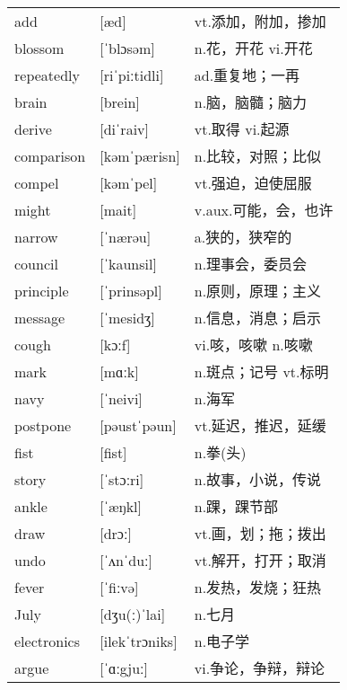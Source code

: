 \documentclass[a4paper]{article}
\begin{document}
\section{}
\begin{tabular}{l l l}

add & [æd] & vt.添加，附加，掺加 \\
blossom & [ˈblɔsəm] & n.花，开花 vi.开花 \\
repeatedly & [riˈpiːtidli] & ad.重复地；一再 \\
brain & [brein] & n.脑，脑髓；脑力 \\
derive & [diˈraiv] & vt.取得 vi.起源 \\
comparison & [kəmˈpærisn] & n.比较，对照；比似 \\
compel & [kəmˈpel] & vt.强迫，迫使屈服 \\
might & [mait] & v.aux.可能，会，也许 \\
narrow & [ˈnærəu] & a.狭的，狭窄的 \\
council & [ˈkaunsil] & n.理事会，委员会 \\
principle & [ˈprinsəpl] & n.原则，原理；主义 \\
message & [ˈmesidʒ] & n.信息，消息；启示 \\
cough & [kɔːf] & vi.咳，咳嗽 n.咳嗽 \\
mark & [mɑːk] & n.斑点；记号 vt.标明 \\
navy & [ˈneivi] & n.海军 \\
postpone & [pəustˈpəun] & vt.延迟，推迟，延缓 \\
fist & [fist] & n.拳(头) \\
story & [ˈstɔːri] & n.故事，小说，传说 \\
ankle & [ˈæŋkl] & n.踝，踝节部 \\
draw & [drɔː] & vt.画，划；拖；拨出 \\
undo & [ˈʌnˈduː] & vt.解开，打开；取消 \\
fever & [ˈfiːvə] & n.发热，发烧；狂热 \\
July & [dʒu(ː)ˈlai] & n.七月 \\
electronics & [ilekˈtrɔniks] & n.电子学 \\
argue & [ˈɑːgjuː] & vi.争论，争辩，辩论 \\

\end{tabular}
\end{document}
